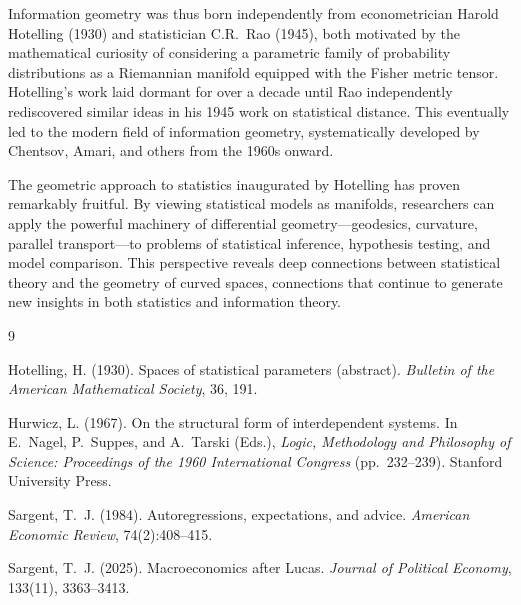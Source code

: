 \documentclass[12pt]{article}
\begin{document}
Information geometry was thus born independently from econometrician Harold Hotelling (1930) and statistician C.R.\ Rao (1945), both motivated by the mathematical curiosity of considering a parametric family of probability distributions as a Riemannian manifold equipped with the Fisher metric tensor. Hotelling's work laid dormant for over a decade until Rao independently rediscovered similar ideas in his 1945 work on statistical distance. This eventually led to the modern field of information geometry, systematically developed by Chentsov, Amari, and others from the 1960s onward.

The geometric approach to statistics inaugurated by Hotelling has proven remarkably fruitful. By viewing statistical models as manifolds, researchers can apply the powerful machinery of differential geometry---geodesics, curvature, parallel transport---to problems of statistical inference, hypothesis testing, and model comparison. This perspective reveals deep connections between statistical theory and the geometry of curved spaces, connections that continue to generate new insights in both statistics and information theory.

\begin{thebibliography}{9}


Hotelling, H. (1930). Spaces of statistical parameters (abstract). \emph{Bulletin of the American Mathematical Society}, 36, 191.

Hurwicz, L. (1967). On the structural form of interdependent systems. In E.~Nagel, P.~Suppes, and A.~Tarski (Eds.), \emph{Logic, Methodology and Philosophy of Science: Proceedings of the 1960 International Congress} (pp.~232--239). Stanford University Press.


Sargent, T.~J. (1984).
\newblock Autoregressions, expectations, and advice.
\newblock \emph{American Economic Review}, 74(2):408--415.

Sargent, T.~J. (2025). Macroeconomics after Lucas. \emph{Journal of Political Economy}, 133(11), 3363--3413.

\end{thebibliography}
\end{document}
